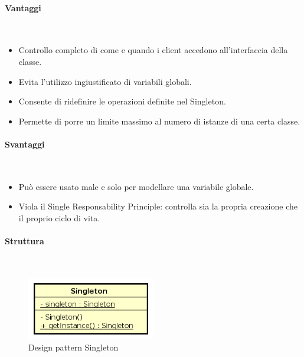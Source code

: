\paragraph{Vantaggi} \mbox{} \\
\begin{itemize}
\item Controllo completo di come e quando i client accedono all’interfaccia della classe.
\item Evita l’utilizzo ingiustificato di variabili globali.
\item Consente di ridefinire le operazioni definite nel Singleton.
\item Permette di porre un limite massimo al numero di istanze di una certa classe.
\end{itemize}
\paragraph{Svantaggi} \mbox{} \\
\begin{itemize}
\item Può essere usato male e solo per modellare una variabile globale.
\item Viola il Single Responsability Principle: controlla sia la propria creazione che il proprio ciclo di vita.
\end{itemize}
\paragraph{Struttura} \mbox{} \\
\begin{figure}[H]
\centering
\includegraphics[width=0.5\textwidth]{res/sections/backend/singleton.png}
\caption{Design pattern Singleton}
\end{figure}
